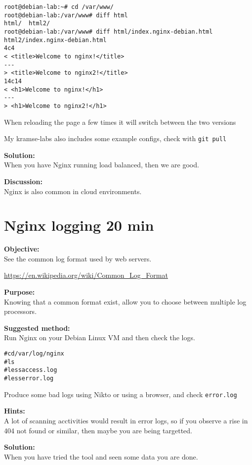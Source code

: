 \documentclass[a4paper,11pt,notitlepage]{report}
\begin{document}
\begin{verbatim}
root@debian-lab:~# cd /var/www/
root@debian-lab:/var/www# diff html
html/  html2/
root@debian-lab:/var/www# diff html/index.nginx-debian.html html2/index.nginx-debian.html
4c4
< <title>Welcome to nginx!</title>
---
> <title>Welcome to nginx2!</title>
14c14
< <h1>Welcome to nginx!</h1>
---
> <h1>Welcome to nginx2!</h1>
\end{verbatim}

When reloading the page a few times it will switch between the two versions

My kramse-labs also includes some example configs, check with \verb+git pull+

{\bf Solution:}\\
When you have Nginx running load balanced, then we are good.

{\bf Discussion:}\\
Nginx is also common in cloud environments.

\chapter{Nginx logging  20 min}
\label{ex:nginx-logging}

{\bf Objective:}\\
See the common log format used by web servers.

\url{https://en.wikipedia.org/wiki/Common_Log_Format}


{\bf Purpose:}\\
Knowing that a common format exist, allow you to choose between multiple log processors.


{\bf Suggested method:}\\
Run Nginx on your Debian Linux VM and then check the logs.


\begin{alltt}
# cd /var/log/nginx
# ls
# less access.log
# less error.log
\end{alltt}


Produce some bad logs using Nikto or using a browser, and check \verb+error.log+


{\bf Hints:}\\
A lot of scanning acctivities would result in error logs, so if you observe a rise in 404 not found or similar, then maybe you are being targetted.

{\bf Solution:}\\
When you have tried the tool and seen some data you are done.
\end{document}
